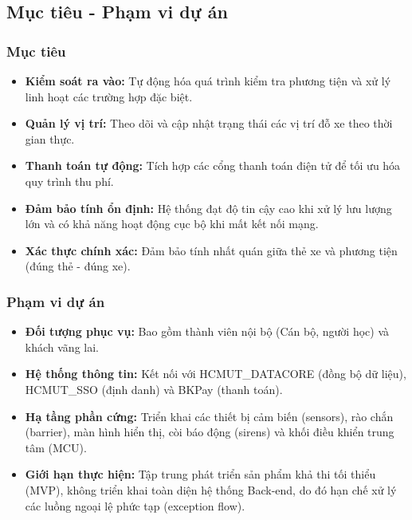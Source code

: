 \subsection{Mục tiêu - Phạm vi dự án}
\subsubsection{Mục tiêu}
\begin{itemize}
    \item \textbf{Kiểm soát ra vào:} Tự động hóa quá trình kiểm tra phương tiện và xử lý linh hoạt các trường hợp đặc biệt.
    \vspace{-10pt}
    \item \textbf{Quản lý vị trí:} Theo dõi và cập nhật trạng thái các vị trí đỗ xe theo thời gian thực.
    \vspace{-10pt}
    \item \textbf{Thanh toán tự động:} Tích hợp các cổng thanh toán điện tử để tối ưu hóa quy trình thu phí.
    \vspace{-10pt}
    \item \textbf{Đảm bảo tính ổn định:} Hệ thống đạt độ tin cậy cao khi xử lý lưu lượng lớn và có khả năng hoạt động cục bộ khi mất kết nối mạng.
    \vspace{-10pt}
    \item \textbf{Xác thực chính xác:} Đảm bảo tính nhất quán giữa thẻ xe và phương tiện (đúng thẻ - đúng xe).
\end{itemize}
\subsubsection{Phạm vi dự án}
\begin{itemize}
    \item \textbf{Đối tượng phục vụ:} Bao gồm thành viên nội bộ (Cán bộ, người học) và khách vãng lai.
    \vspace{-10pt}
    \item \textbf{Hệ thống thông tin:} Kết nối với HCMUT\_DATACORE (đồng bộ dữ liệu), HCMUT\_SSO (định danh) và BKPay (thanh toán).
    \vspace{-10pt}
    \item \textbf{Hạ tầng phần cứng:} Triển khai các thiết bị cảm biến (sensors), rào chắn (barrier), màn hình hiển thị, còi báo động (sirens) và khối điều khiển trung tâm (MCU).
    \vspace{-10pt}
    \item \textbf{Giới hạn thực hiện:} Tập trung phát triển sản phẩm khả thi tối thiểu (MVP), không triển khai toàn diện hệ thống Back-end, do đó hạn chế xử lý các luồng ngoại lệ phức tạp (exception flow).
\end{itemize}